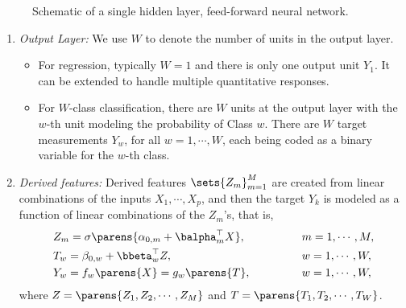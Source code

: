 \documentclass[12pt]{article}
\begin{document}
\begin{enumerate}[label=\textbf{\arabic*.}]
\begin{figure}[h!]
		
		\caption{Schematic of a single hidden layer, feed-forward neural network. }
		\label{network.diagram}
		
	\end{figure}
	
	\begin{enumerate}
		\item \textit{Output Layer:} We use $W$ to denote the number of units in the output layer. 
		\begin{itemize}
			\item For regression, typically $W = 1$ and there is only one output unit $Y_1$. It can be extended to handle multiple quantitative responses. 
			\item For $W$-class classification, there are $W$ units at the output layer with the $w$-th unit modeling the probability of Class $w$. There are $W$ target measurements $Y_w$, for all $w = 1, \cdots, W$, each being coded as a binary variable for the $w$-th class. 
		\end{itemize}
		
		\item \textit{Derived features:} Derived features $\sets{Z_m}_{m=1}^M$ are created from linear combinations of the inputs $X_1, \cdots, X_p$, and then the target $Y_k$ is modeled as a function of linear combinations of the $Z_m$'s, that is, 
		\begin{equation*}
			\begin{aligned}
				& \, Z_m = \sigma \parens{\alpha_{0,m} + \balpha_{m}^\top X}, \qquad \qquad && \, m = 1, \cdots, M, \\ 
				& \, T_w = \beta_{0,w} + \bbeta_w^\top Z, && \, w = 1, \cdots, W, \\ 
				& \, Y_w = f_w \parens{X} = g_w \parens{T}, && \, w = 1, \cdots, W, 
			\end{aligned}
		\end{equation*}
		where $Z = \parens{Z_1, Z_2, \cdots, Z_M}$ and $T = \parens{T_1, T_2, \cdots, T_W}$. 
		

\end{enumerate}
\end{enumerate}
\end{document}
